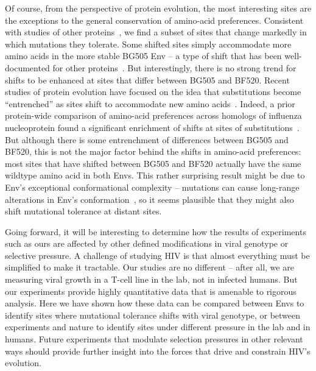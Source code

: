 \documentclass[9pt]{elife}
\begin{document}
Of course, from the perspective of protein evolution, the most interesting sites are the exceptions to the general conservation of amino-acid preferences.
Consistent with studies of other proteins~\citep{natarajan2013epistasis,harms2014historical,doud2015site,starr2017pervasive}, we find a subset of sites that change markedly in which mutations they tolerate.
Some shifted sites simply accommodate more amino acids in the more stable BG505 Env -- a type of shift that has been well-documented for other proteins~\citep{wang2002evolution,bloom2006protein,gong2013stability,kumar2017stability}.
But interestingly, there is no strong trend for shifts to be enhanced at sites that differ between BG505 and BF520.
Recent studies of protein evolution have focused on the idea that substitutions become ``entrenched'' as sites shift to accommodate new amino acids~\citep{pollock2012amino,shah2015contingency,bazykin2015changing,starr2017pervasive}.
Indeed, a prior protein-wide comparison of amino-acid preferences across homologs of influenza nucleoprotein found a significant enrichment of shifts at sites of substitutions~\citep{doud2015site}.
But although there is some entrenchment of differences between BG505 and BF520, this is not the major factor behind the shifts in amino-acid preferences: most sites that have shifted between BG505 and BF520 actually have the same wildtype amino acid in both Envs.
This rather surprising result might be due to Env's exceptional conformational complexity -- mutations can cause long-range alterations in Env's conformation~\citep{kwong2000structures,white2010molecular,almond2010structural,davenport2013isolate}, so it seems plausible that they might also shift mutational tolerance at distant sites. 

Going forward, it will be interesting to determine how the results of experiments such as ours are affected by other defined modifications in viral genotype or selective pressure.
A challenge of studying HIV is that almost everything must be simplified to make it tractable.
Our studies are no different -- after all, we are measuring viral growth in a T-cell line in the lab, not in infected humans.
But our experiments provide highly quantitative data that is amenable to rigorous analysis.
Here we have shown how these data can be compared between Envs to identify sites where mutational tolerance shifts with viral genotype, or between experiments and nature to identify sites under different pressure in the lab and in humans.
Future experiments that modulate selection pressures in other relevant ways should provide further insight into the forces that drive and constrain HIV's evolution.
\end{document}
